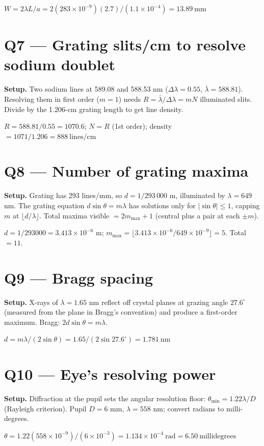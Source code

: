 \documentclass[11pt]{article}
\begin{document}
$W = 2\lambda L/a = 2(283\times10^{-9})(2.7)/(1.1\times10^{-4}) = \boxed{13.89\ \text{mm}}$

\section*{Q7 --- Grating slits/cm to resolve sodium doublet}
\textbf{Setup.} Two sodium lines at 589.08 and 588.53 nm ($\Delta\lambda=0.55$, $\bar\lambda=588.81$). Resolving them in first order ($m=1$) needs $R = \bar\lambda/\Delta\lambda = mN$ illuminated slits. Divide by the 1.206-cm grating length to get line density.

$R = 588.81/0.55 = 1070.6$; $N = R$ (1st order); density $= 1071/1.206 = \boxed{888\ \text{lines/cm}}$

\section*{Q8 --- Number of grating maxima}
\textbf{Setup.} Grating has 293 lines/mm, so $d=1/293\,000$ m, illuminated by $\lambda=649$ nm. The grating equation $d\sin\theta = m\lambda$ has solutions only for $|\sin\theta|\le 1$, capping $m$ at $\lfloor d/\lambda\rfloor$. Total maxima visible $= 2m_{\max}+1$ (central plus a pair at each $\pm m$).

$d = 1/293000 = 3.413\times10^{-6}$ m; $m_{\max} = \lfloor 3.413\times10^{-6}/649\times10^{-9}\rfloor = 5$. Total $= \boxed{11}$.

\section*{Q9 --- Bragg spacing}
\textbf{Setup.} X-rays of $\lambda=1.65$ nm reflect off crystal planes at grazing angle $27.6^\circ$ (measured from the plane in Bragg's convention) and produce a first-order maximum. Bragg: $2d\sin\theta = m\lambda$.

$d = m\lambda/(2\sin\theta) = 1.65/(2\sin 27.6^\circ) = \boxed{1.781\ \text{nm}}$

\section*{Q10 --- Eye's resolving power}
\textbf{Setup.} Diffraction at the pupil sets the angular resolution floor: $\theta_{\min} = 1.22\lambda/D$ (Rayleigh criterion). Pupil $D=6$ mm, $\lambda=558$ nm; convert radians to milli-degrees.

$\theta = 1.22(558\times10^{-9})/(6\times10^{-3}) = 1.134\times10^{-4}\ \text{rad} = \boxed{6.50\ \text{millidegrees}}$
\end{document}
